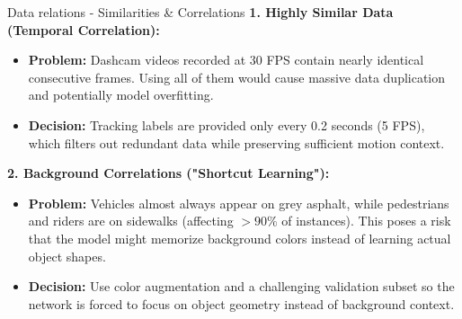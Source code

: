 \documentclass{beamer}
\begin{document}
\begin{frame}{Data relations - Similarities \& Correlations}
    \textbf{1. Highly Similar Data (Temporal Correlation):}
    \begin{itemize}
        \item \textbf{Problem:} Dashcam videos recorded at 30 FPS contain nearly identical consecutive frames. Using all of them would cause massive data duplication and potentially model overfitting.
        \item \textbf{Decision:} Tracking labels are provided only every 0.2 seconds (5 FPS), which filters out redundant data while preserving sufficient motion context.
    \end{itemize}

    \vspace{0.4cm}
    \textbf{2. Background Correlations ("Shortcut Learning"):}
    \begin{itemize}
        \item \textbf{Problem:} Vehicles almost always appear on grey asphalt, while pedestrians and riders are on sidewalks (affecting $>90\%$ of instances). This poses a risk that the model might memorize background colors instead of learning actual object shapes.
        \item \textbf{Decision:} Use color augmentation and a challenging validation subset so the network is forced to focus on object geometry instead of background context.
    \end{itemize}
\end{frame}
\end{document}
